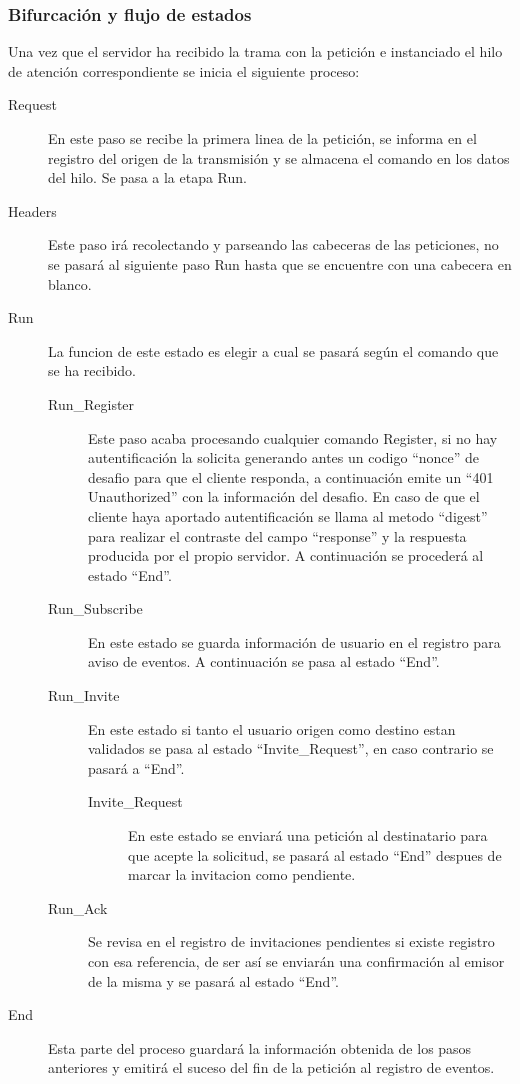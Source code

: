 \documentclass[a4paper,spanish,12pt]{book}
\begin{document}
\subsubsection{Bifurcación y flujo de estados} 
Una vez que el servidor ha recibido la trama con la petición e instanciado el hilo de atención correspondiente se inicia el siguiente proceso:
\begin{description}
	\item[Request] En este paso se recibe la primera linea de la petición, se informa en el registro del origen de la transmisión y se almacena el comando en los datos del hilo. Se pasa a la etapa Run.
	\item[Headers] Este paso irá recolectando y parseando las cabeceras de las peticiones, no se pasará al siguiente paso Run hasta que se encuentre con una cabecera en blanco.
	\item[Run] La funcion de este estado es elegir a cual se pasará según el comando que se ha recibido.
	\begin{description}
		\item[Run\_Register] Este paso acaba procesando cualquier comando Register, si no hay autentificación la solicita generando antes un codigo ``nonce'' de desafio para que el cliente responda, a continuación emite un ``401 Unauthorized'' con la información del desafio. En caso de que el cliente haya aportado autentificación se llama al metodo ``digest'' para realizar el contraste del campo ``response'' y la respuesta producida por el propio servidor. A continuación se procederá al estado ``End''.
		\item[Run\_Subscribe] En este estado se guarda información de usuario en el registro para aviso de eventos. A continuación se pasa al estado ``End''.
		\item[Run\_Invite] En este estado si tanto el usuario origen como destino estan validados se pasa al estado ``Invite\_Request'', en caso contrario se pasará a ``End''.
		\begin{description}
			\item[Invite\_Request] En este estado se enviará una petición al destinatario para que acepte la solicitud, se pasará al estado ``End'' despues de marcar la invitacion como pendiente.
		\end{description}
		\item[Run\_Ack] Se revisa en el registro de invitaciones pendientes si existe registro con esa referencia, de ser así se enviarán una confirmación al emisor de la misma y se pasará al estado ``End''.
	\end{description}
	\item[End] Esta parte del proceso guardará la información obtenida de los pasos anteriores y emitirá el suceso del fin de la petición al registro de eventos.
\end{description}
\end{document}

